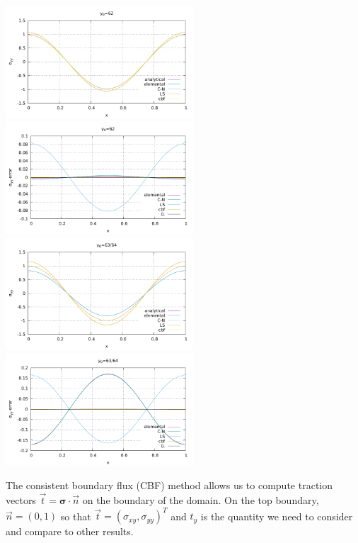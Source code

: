 \begin{center}
\includegraphics[width=7cm]{python_codes/fieldstone_27/results/62_64/sigmazz.pdf}
\includegraphics[width=7cm]{python_codes/fieldstone_27/results/62_64/sigmazz_error.pdf}\\
\includegraphics[width=7cm]{python_codes/fieldstone_27/results/63_64/sigmazz.pdf}
\includegraphics[width=7cm]{python_codes/fieldstone_27/results/63_64/sigmazz_error.pdf}
\end{center}

The consistent boundary flux (CBF) method allows us to compute traction vectors $\vec{t}={\bm \sigma}\cdot\vec{n}$
on the boundary of the domain. On the top boundary, $\vec{n}=(0,1)$ so that $\vec{t}=(\sigma_{xy}, \sigma_{yy})^T$ and 
$t_y$ is the quantity we need to consider and compare to other results.

